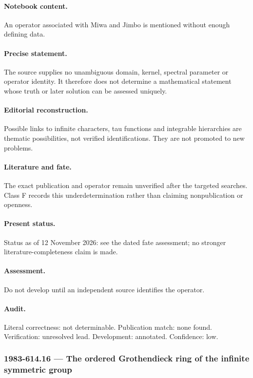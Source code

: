 \paragraph{Notebook content.} An operator associated with Miwa and Jimbo is mentioned without enough defining data.

\paragraph{Precise statement.} The source supplies no unambiguous domain, kernel, spectral parameter or operator identity. It therefore does not determine a mathematical statement whose truth or later solution can be assessed uniquely.

\paragraph{Editorial reconstruction.} Possible links to infinite characters, tau functions and integrable hierarchies are thematic possibilities, not verified identifications. They are not promoted to new problems.

\paragraph{Literature and fate.} The exact publication and operator remain unverified after the targeted searches. Class F records this underdetermination rather than claiming nonpublication or openness.

\paragraph{Present status.} Status as of 12 November 2026: see the dated fate assessment; no stronger literature-completeness claim is made.

\paragraph{Assessment.} Do not develop until an independent source identifies the operator.

\paragraph{Audit.} Literal correctness: not determinable. Publication match: none found. Verification: unresolved lead. Development: annotated. Confidence: low.

\subsubsection{1983-614.16 --- The ordered Grothendieck ring of the infinite symmetric group}


